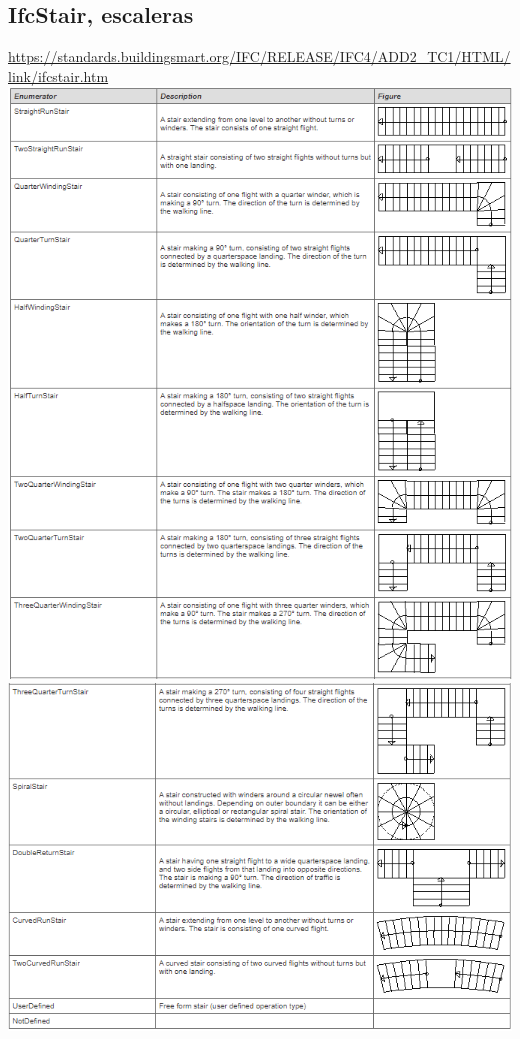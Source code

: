 \documentclass[spanish,12pt,a4paper,final,oneside]{book}
\begin{document}
\subsection{IfcStair, escaleras}
\url{https://standards.buildingsmart.org/IFC/RELEASE/IFC4/ADD2_TC1/HTML/link/ifcstair.htm}
\\ \includegraphics[width=\textwidth]{Definicion de IfcStairTypeEnum-1}
\\ \includegraphics[width=\textwidth]{Definicion de IfcStairTypeEnum-2}
\end{document}
